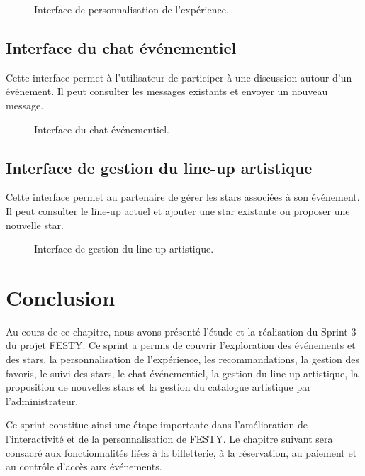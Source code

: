 \begin{figure}[H]
\centering
{}
\caption{Interface de personnalisation de l’expérience.}
\label{figure:5-9}
\end{figure}


\subsection{Interface du chat événementiel}


Cette interface permet à l’utilisateur de participer à une discussion autour d’un événement. Il peut consulter les messages existants et envoyer un nouveau message.


\begin{figure}[H]
\centering
{}
\caption{Interface du chat événementiel.}
\label{figure:5-10}
\end{figure}


\subsection{Interface de gestion du line-up artistique}


Cette interface permet au partenaire de gérer les stars associées à son événement. Il peut consulter le line-up actuel et ajouter une star existante ou proposer une nouvelle star.


\begin{figure}[H]
\centering
{}
\caption{Interface de gestion du line-up artistique.}
\label{figure:5-11}
\end{figure}


\section{Conclusion}


Au cours de ce chapitre, nous avons présenté l’étude et la réalisation du Sprint 3 du projet FESTY. Ce sprint a permis de couvrir l’exploration des événements et des stars, la personnalisation de l’expérience, les recommandations, la gestion des favoris, le suivi des stars, le chat événementiel, la gestion du line-up artistique, la proposition de nouvelles stars et la gestion du catalogue artistique par l’administrateur.


Ce sprint constitue ainsi une étape importante dans l’amélioration de l’interactivité et de la personnalisation de FESTY. Le chapitre suivant sera consacré aux fonctionnalités liées à la billetterie, à la réservation, au paiement et au contrôle d’accès aux événements.


